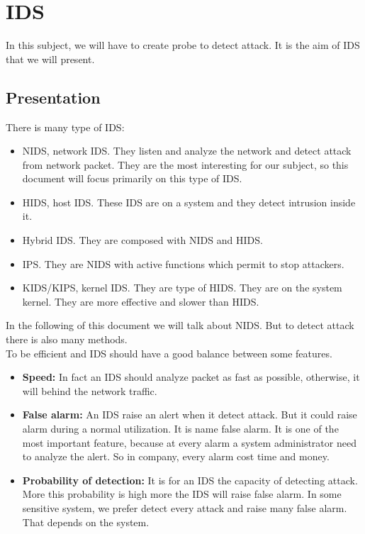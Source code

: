 \chapter{IDS}

In this subject, we will have to create probe to detect attack. It is the aim of IDS that we will present.

\section{Presentation}




There is many type of IDS:
\begin{itemize}[itemsep=0pt]
\item NIDS, network IDS. They listen and analyze the network and detect attack from network packet. They are the
  most interesting for our subject, so this document will focus primarily on this type of IDS.
\item HIDS, host IDS. These IDS are on a system and they detect intrusion inside it.
\item Hybrid IDS. They are composed with NIDS and HIDS.
\item IPS. They are NIDS with active functions which permit to stop attackers.
\item KIDS/KIPS, kernel IDS. They are type of HIDS. They are on the system kernel. They are more effective and
slower than HIDS.
\end{itemize}

In the following of this document we will talk about NIDS. But to detect attack there is also many methods.
~\\


To be efficient and IDS should have a good balance between some features.
\begin{itemize}[itemsep=0pt]
\item \textbf{Speed:} In fact an IDS should analyze packet as fast as possible, otherwise, it will behind the network
  traffic.
\item \textbf{False alarm:} An IDS raise an alert when it detect attack. But it could raise alarm during a normal
  utilization. It is name false alarm. It is one of the most important feature, because at every alarm a system
  administrator need to analyze the alert. So in company, every alarm cost time and money.
\item \textbf{Probability of detection:} It is for an IDS the capacity of detecting attack. More this probability is high
  more the IDS will raise false alarm. In some sensitive system, we prefer detect every attack and raise many
  false alarm. That depends on the system.
\end{itemize}


